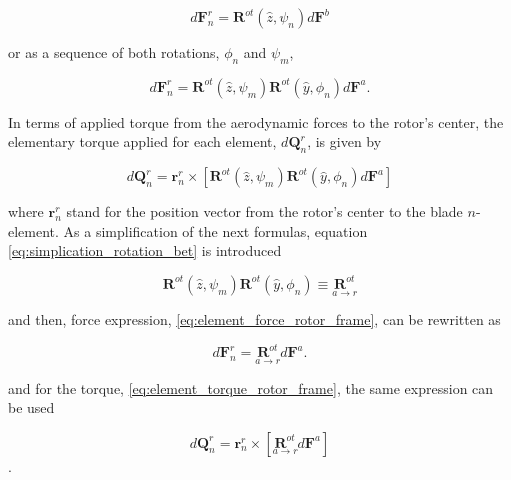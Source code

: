 \begin{equation}
    d\mathbf{F}^r_n = \boldsymbol{R}^{ot}(\hat{z}, \psi_n) d\mathbf{F}^b
\end{equation}

\noindent or as a sequence of both rotations, $\phi_n$ and $\psi_m$,

\begin{equation}
    d\mathbf{F}^r_n = \boldsymbol{R}^{ot}(\hat{z}, \psi_m) \boldsymbol{R}^{ot}(\hat{y}, \phi_n) d\mathbf{F}^a.
    \label{eq:element_force_rotor_frame}
\end{equation}

In terms of applied torque from the aerodynamic forces to the rotor's center, the elementary torque applied for each element, $d\mathbf{Q}^r_n$, is given by 

\begin{equation}
    d\mathbf{Q}^r_n = \mathbf{r}^r_n \times \left[ \boldsymbol{R}^{ot}(\hat{z}, \psi_m) \boldsymbol{R}^{ot}(\hat{y}, \phi_n) d\mathbf{F}^a \right] 
    \label{eq:element_torque_rotor_frame}
\end{equation}

\noindent where $\mathbf{r}^r_n$ stand for the position vector from the rotor's center to the blade $n$-element. As a simplification of the next formulas, equation  \ref{eq:simplication_rotation_bet} is introduced

\begin{equation}
    \boldsymbol{R}^{ot}(\hat{z}, \psi_m) \boldsymbol{R}^{ot}(\hat{y}, \phi_n) \equiv \underset{a \to r}{\boldsymbol{R}^{ot}}
    \label{eq:simplication_rotation_bet}
\end{equation}

\noindent and then, force expression, \ref{eq:element_force_rotor_frame}, can be rewritten as

\begin{equation}
    d\mathbf{F}^r_n = \underset{a \to r}{\boldsymbol{R}^{ot}} d\mathbf{F}^a.
    \label{eq:element_force_rotor_frame_simplified}
\end{equation}

\noindent and for the torque, \ref{eq:element_torque_rotor_frame}, the same expression can be used

\begin{equation}
    d\mathbf{Q}^r_n = \mathbf{r}^r_n \times \left[ \underset{a \to r}{\boldsymbol{R}^{ot}}  d\mathbf{F}^a \right] 
    \label{eq:element_torque_rotor_frame_simplified}
\end{equation}.

